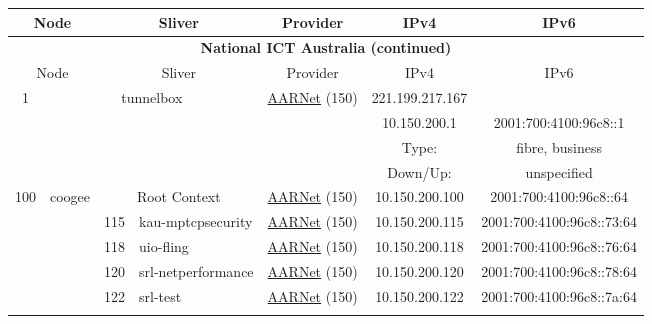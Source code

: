 \begin{small}
\begin{center}
\begin{longtable}{|c|c|c|c|c|c|c|c|}
 \multicolumn{2}{|p{8em}|}{Node} & \multicolumn{2}{|p{8em}|}{Sliver} & \multicolumn{2}{|p{8em}|}{Provider} & IPv4 & IPv6 \\ \hline
\endfirsthead
\hline
 \multicolumn{8}{|c|}{\textbf{National ICT Australia (continued)}} \\ \hline
 \multicolumn{2}{|p{8em}|}{Node} & \multicolumn{2}{|p{8em}|}{Sliver} & \multicolumn{2}{|p{8em}|}{Provider} & IPv4 & IPv6 \\ \hline
\endhead
 \multirow{4}{*}{\tiny{1}} & \multicolumn{3}{|c|}{\multirow{4}{*}{\tiny{tunnelbox}}} & \multicolumn{2}{|c|}{\multirow{4}{*}{\tiny{\href{https://www.aarnet.edu.au/}{AARNet} (150)}}} & \tiny{221.199.217.167} & \frownie{} \\* \cline{7-7}\cline{8-8}
  & \multicolumn{3}{|c|}{} & \multicolumn{2}{|c|}{} & \tiny{10.150.200.1} & \tiny{2001:700:4100:96c8::1} \\* \cline{7-7}\cline{8-8}
  & \multicolumn{3}{|c|}{} & \multicolumn{2}{|c|}{} & Type: & fibre, business \\* \cline{7-7}\cline{8-8}
  & \multicolumn{3}{|c|}{} & \multicolumn{2}{|c|}{} & Down/Up:  & unspecified \\ \hline
 \multirow{29}{*}{\tiny{100}} & \multicolumn{1}{|l|}{\multirow{29}{*}{\tiny{coogee}}} & \multicolumn{2}{|c|}{\tiny{Root Context}} & \multicolumn{2}{|c|}{\tiny{\href{https://www.aarnet.edu.au/}{AARNet} (150)}} & \tiny{10.150.200.100} & \tiny{2001:700:4100:96c8::64} \\* \cline{3-3}\cline{4-4}\cline{5-5}\cline{6-6}\cline{7-7}\cline{8-8}
  &  & \tiny{115} & \multicolumn{1}{|l|}{\tiny{kau-mptcpsecurity}} & \multicolumn{2}{|c|}{\tiny{\href{https://www.aarnet.edu.au/}{AARNet} (150)}} & \tiny{10.150.200.115} & \tiny{2001:700:4100:96c8::73:64} \\* \cline{3-3}\cline{4-4}\cline{5-5}\cline{6-6}\cline{7-7}\cline{8-8}
  &  & \tiny{118} & \multicolumn{1}{|l|}{\tiny{uio-fling}} & \multicolumn{2}{|c|}{\tiny{\href{https://www.aarnet.edu.au/}{AARNet} (150)}} & \tiny{10.150.200.118} & \tiny{2001:700:4100:96c8::76:64} \\* \cline{3-3}\cline{4-4}\cline{5-5}\cline{6-6}\cline{7-7}\cline{8-8}
  &  & \tiny{120} & \multicolumn{1}{|l|}{\tiny{srl-netperformance}} & \multicolumn{2}{|c|}{\tiny{\href{https://www.aarnet.edu.au/}{AARNet} (150)}} & \tiny{10.150.200.120} & \tiny{2001:700:4100:96c8::78:64} \\* \cline{3-3}\cline{4-4}\cline{5-5}\cline{6-6}\cline{7-7}\cline{8-8}
  &  & \tiny{122} & \multicolumn{1}{|l|}{\tiny{srl-test}} & \multicolumn{2}{|c|}{\tiny{\href{https://www.aarnet.edu.au/}{AARNet} (150)}} & \tiny{10.150.200.122} & \tiny{2001:700:4100:96c8::7a:64} \\* \cline{3-3}\cline{4-4}\cline{5-5}\cline{6-6}\cline{7-7}\cline{8-8}

\end{longtable}
\end{center}
\end{small}
